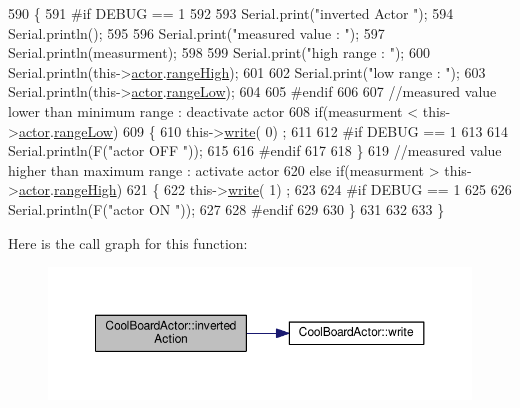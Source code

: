 \begin{DoxyCode}
590 \{
591 \textcolor{preprocessor}{#if DEBUG == 1}
592     
593     Serial.print(\textcolor{stringliteral}{"inverted Actor "});
594     Serial.println();
595 
596     Serial.print(\textcolor{stringliteral}{"measured value : "});
597     Serial.println(measurment);
598 
599     Serial.print(\textcolor{stringliteral}{"high range : "});
600     Serial.println(this->\hyperlink{class_cool_board_actor_a8f190db9f7a39fddbcef7f152da970e9}{actor}.\hyperlink{struct_cool_board_actor_1_1state_a6e5cd6c5cd44e2decfd8d4df1853f8e3}{rangeHigh});
601 
602     Serial.print(\textcolor{stringliteral}{"low range : "});
603     Serial.println(this->\hyperlink{class_cool_board_actor_a8f190db9f7a39fddbcef7f152da970e9}{actor}.\hyperlink{struct_cool_board_actor_1_1state_a43f891c9fb3bb63575c27cec860de55a}{rangeLow});
604 
605 \textcolor{preprocessor}{#endif}
606 
607     \textcolor{comment}{//measured value lower than minimum range : deactivate actor}
608     \textcolor{keywordflow}{if}(measurment < this->\hyperlink{class_cool_board_actor_a8f190db9f7a39fddbcef7f152da970e9}{actor}.\hyperlink{struct_cool_board_actor_1_1state_a43f891c9fb3bb63575c27cec860de55a}{rangeLow})
609     \{
610         this->\hyperlink{class_cool_board_actor_a958786ff01ea1056ee72c72d439f86da}{write}( 0) ;
611 
612 \textcolor{preprocessor}{    #if DEBUG == 1 }
613 
614         Serial.println(F(\textcolor{stringliteral}{"actor OFF "}));
615     
616 \textcolor{preprocessor}{    #endif}
617 
618     \}
619     \textcolor{comment}{//measured value higher than maximum range : activate actor}
620     \textcolor{keywordflow}{else} \textcolor{keywordflow}{if}(measurment > this->\hyperlink{class_cool_board_actor_a8f190db9f7a39fddbcef7f152da970e9}{actor}.\hyperlink{struct_cool_board_actor_1_1state_a6e5cd6c5cd44e2decfd8d4df1853f8e3}{rangeHigh})
621     \{
622         this->\hyperlink{class_cool_board_actor_a958786ff01ea1056ee72c72d439f86da}{write}( 1) ;
623 
624 \textcolor{preprocessor}{    #if DEBUG == 1 }
625 
626         Serial.println(F(\textcolor{stringliteral}{"actor ON "}));
627     
628 \textcolor{preprocessor}{    #endif}
629 
630     \}
631 
632 
633 \}
\end{DoxyCode}
Here is the call graph for this function\+:\nopagebreak
\begin{figure}[H]
\begin{center}
\leavevmode
\includegraphics[width=350pt]{dc/d69/class_cool_board_actor_aae82b2e62f91be009d40f93c206f9bda_cgraph}
\end{center}
\end{figure}
